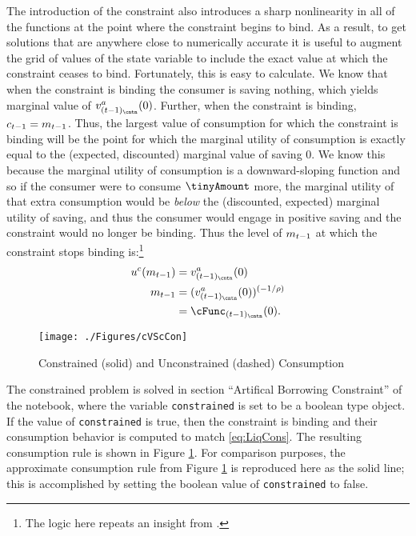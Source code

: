 \documentclass[SolvingMicroDSOPs]{subfiles}
\begin{document}
The introduction of the constraint also introduces a sharp
nonlinearity in all of the functions at the point where the constraint
begins to bind.  As a result, to get solutions that are anywhere close
to numerically accurate it is useful to augment the grid of values of
the state variable to include the exact value at which the constraint
ceases to bind.  Fortunately, this is easy to calculate.  We know that
when the constraint is binding the consumer is saving nothing, which
yields marginal value of $\vFunc^{a}_{({\prd-1})_\cntn}(0)$. Further, when the
constraint is binding, $c_{t-1} = m_{t-1}$.  Thus, the largest
value of consumption for which the constraint is binding will be the
point for which the marginal utility of consumption is exactly equal
to the (expected, discounted) marginal value of saving 0.  We know
this because the marginal utility of consumption is a downward-sloping
function and so if the consumer were to consume $\tinyAmount$ more,
the marginal utility of that extra consumption would be \textit{below}
the (discounted, expected) marginal utility of saving, and thus the
consumer would engage in positive saving and the constraint would no
longer be binding.  Thus the level of $m_{t-1}$ at which the
constraint stops binding is:\footnote{The logic here repeats an insight from \cite{deatonLiqConstr}.}
\begin{equation}\begin{gathered}\begin{aligned}
      \uFunc^{c}(m_{\prd-1})  & = \vFunc^{a}_{({\prd-1})_\cntn}(0)  \nonumber \\
      m_{\prd-1}  & = (\vFunc^{a}_{({\prd-1})_\cntn}(0))^{(-1/\CRRA)}  \nonumber
      \\        & = \cFunc_{({\prd-1})_\cntn}(0). \label{eq:LCbindsTm1}
    \end{aligned}\end{gathered}\end{equation}

\hypertarget{cVScCon}{}
\begin{figure}
  \texttt{[image: ./Figures/cVScCon]}
  \caption{Constrained (solid) and Unconstrained (dashed) Consumption}
  \label{fig:cVScCon}
\end{figure}

The constrained problem is solved in section ``Artifical Borrowing Constraint''
of the notebook, where the variable
\texttt{constrained} is set to be a boolean type object. If the value of \texttt{constrained}
is true, then the constraint is binding and their consumption behavior is computed to match
\eqref{eq:LiqCons}. The resulting consumption rule is shown in Figure \ref{fig:cVScCon}. For comparison purposes,
the approximate consumption rule from Figure \ref{fig:cVScCon} is
reproduced here as the solid line; this is accomplished by setting the boolean value
of \texttt{constrained} to false.
\end{document}
